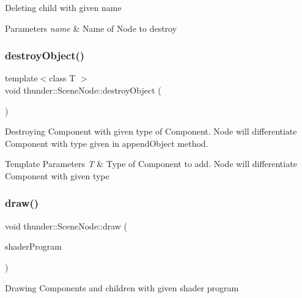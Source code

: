 Deleting child with given name


\begin{DoxyParams}{Parameters}
{\em name} & Name of Node to destroy \\
\hline
\end{DoxyParams}
\mbox{\label{classthunder_1_1_scene_node_aab9414b8a91d75d10e99337312c8b767}} 
\subsubsection{\texorpdfstring{destroy\+Object()}{destroyObject()}}
{\footnotesize\ttfamily template$<$class T $>$ \\
void thunder\+::\+Scene\+Node\+::destroy\+Object (\begin{DoxyParamCaption}{ }\end{DoxyParamCaption})\hspace{0.3cm}{\ttfamily [inline]}}

Destroying Component with given type of Component. Node will differentiate Component with type given in append\+Object method.


\begin{DoxyTemplParams}{Template Parameters}
{\em T} & Type of Component to add. Node will differentiate Component with given type \\
\hline
\end{DoxyTemplParams}
\mbox{\label{classthunder_1_1_scene_node_a9f3165c5da1789dee03d9a89b7164463}} 
\subsubsection{\texorpdfstring{draw()}{draw()}}
{\footnotesize\ttfamily void thunder\+::\+Scene\+Node\+::draw (\begin{DoxyParamCaption}\item[{std\+::shared\+\_\+ptr$<$ \mbox{\hyperlink{classthunder_1_1_shader_program}{Shader\+Program}} $>$}]{shader\+Program }\end{DoxyParamCaption})}

Drawing Components and children with given shader program



